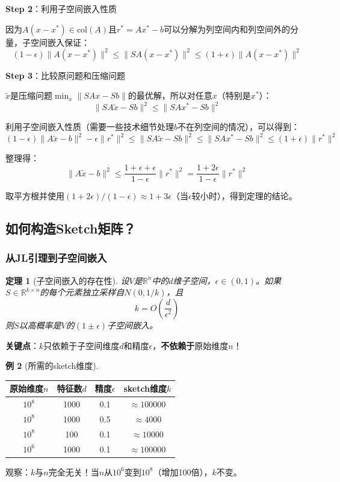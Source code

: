 \documentclass[11pt,a4paper]{ctexart}
\newtheorem{theorem}{定理}[section]
\theoremstyle{definition}
\newtheorem{example}[theorem]{例}
\theoremstyle{remark}
\begin{document}
\textbf{Step 2}：利用子空间嵌入性质

因为$A(x - x^*) \in \text{col}(A)$且$r^* = Ax^* - b$可以分解为列空间内和列空间外的分量，子空间嵌入保证：
\[
(1-\epsilon)\|A(x-x^*)\|^2 \leq \|SA(x-x^*)\|^2 \leq (1+\epsilon)\|A(x-x^*)\|^2
\]

\textbf{Step 3}：比较原问题和压缩问题

$\tilde{x}$是压缩问题$\min_x \|SAx - Sb\|$的最优解，所以对任意$x$（特别是$x^*$）：
\[
\|SA\tilde{x} - Sb\|^2 \leq \|SAx^* - Sb\|^2
\]

利用子空间嵌入性质（需要一些技术细节处理$b$不在列空间的情况），可以得到：
\[
(1-\epsilon)\|A\tilde{x} - b\|^2 - \epsilon\|r^*\|^2 \leq \|SA\tilde{x} - Sb\|^2 \leq \|SAx^* - Sb\|^2 \leq (1+\epsilon)\|r^*\|^2
\]

整理得：
\[
\|A\tilde{x} - b\|^2 \leq \frac{1 + \epsilon + \epsilon}{1 - \epsilon}\|r^*\|^2 = \frac{1 + 2\epsilon}{1 - \epsilon}\|r^*\|^2
\]

取平方根并使用$(1+2\epsilon)/(1-\epsilon) \approx 1 + 3\epsilon$（当$\epsilon$较小时），得到定理的结论。


\subsection{如何构造Sketch矩阵？}

\subsubsection{从JL引理到子空间嵌入}

\begin{theorem}[子空间嵌入的存在性]
设$V$是$\mathbb{R}^n$中的$d$维子空间，$\epsilon \in (0, 1)$。如果$S \in \mathbb{R}^{k \times n}$的每个元素独立采样自$N(0, 1/k)$，且
\[
k = O\left(\frac{d}{\epsilon^2}\right)
\]
则$S$以高概率是$V$的$(1 \pm \epsilon)$子空间嵌入。
\end{theorem}

\textbf{关键点}：$k$只依赖于子空间维度$d$和精度$\epsilon$，\textbf{不依赖于}原始维度$n$！

\begin{example}[所需的sketch维度]
\begin{center}
\begin{tabular}{cccc}
\toprule
原始维度$n$ & 特征数$d$ & 精度$\epsilon$ & sketch维度$k$ \\
\midrule
$10^8$ & 1000 & 0.1 & $\approx 100000$ \\
$10^8$ & 1000 & 0.5 & $\approx 4000$ \\
$10^8$ & 100 & 0.1 & $\approx 10000$ \\
$10^6$ & 1000 & 0.1 & $\approx 100000$ \\
\bottomrule
\end{tabular}
\end{center}

观察：$k$与$n$完全无关！当$n$从$10^6$变到$10^8$（增加100倍），$k$不变。
\end{example}
\end{document}
